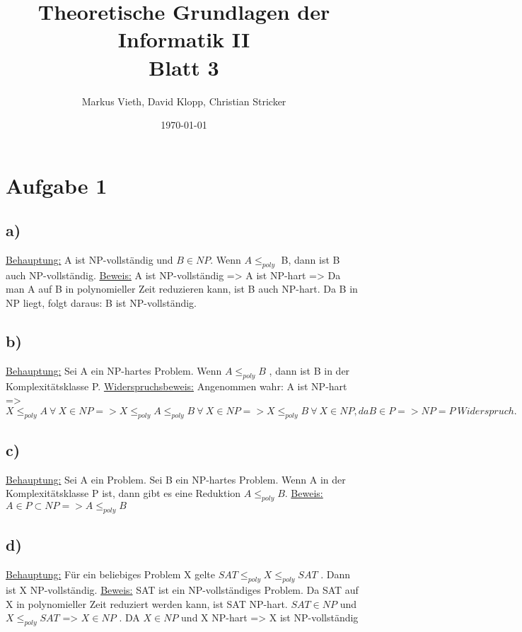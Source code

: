 \documentclass[a4paper,11pt,twoside]{article}
\title{Theoretische Grundlagen der Informatik II\\ Blatt 3}
\author{Markus Vieth, David Klopp, Christian Stricker}
\date{\today}
\begin{document}
\maketitle
\cleardoublepage
\pagestyle{myheadings}

\section*{Aufgabe 1}

\subsection*{a)}
\underline{Behauptung:} A ist NP-vollständig und $ B \in NP $. Wenn  $ A \leq_{poly} $ B, dann ist B auch NP-vollständig.
\newline
\underline{Beweis:} A ist NP-vollständig => A ist NP-hart => Da man A auf B in polynomieller Zeit reduzieren kann, ist B auch NP-hart. Da B in NP liegt, folgt daraus: B ist NP-vollständig.

\subsection*{b)}
\underline{Behauptung:} Sei A ein NP-hartes Problem. Wenn  $ A \leq_{poly} B $ , dann ist B in der Komplexitätsklasse P.
\newline
\underline{Widerspruchsbeweis:} Angenommen wahr: A ist NP-hart => $ X \leq_{poly} A ~ \forall ~ X \in NP => X \leq_{poly} A \leq_{poly} B ~ \forall ~ X \in NP => X \leq_{poly} B ~\forall~ X \in NP, da B \in P => NP = P ~ Widerspruch. $

\subsection*{c)}
\underline{Behauptung:} Sei A ein Problem. Sei B ein NP-hartes Problem. Wenn A in der Komplexitätsklasse P ist, dann gibt es eine Reduktion $ A \leq_{poly} B$.
\newline
\underline{Beweis:} $ A \in P  \subset NP =>  A \leq_{poly} B $

\subsection*{d)}
\underline{Behauptung:} Für ein beliebiges Problem X gelte $ SAT \leq_{poly} X \leq_{poly} SAT$ . Dann ist X NP-vollständig.
\newline
\underline{Beweis:} SAT ist ein NP-vollständiges Problem. Da SAT auf X in polynomieller Zeit reduziert werden kann, ist SAT NP-hart. 
\newline
$SAT \in NP $ und $ X \leq_{poly} SAT $ => $ X \in NP $ . DA $ X \in NP $ und X NP-hart => X ist NP-vollständig 
\end{document}
